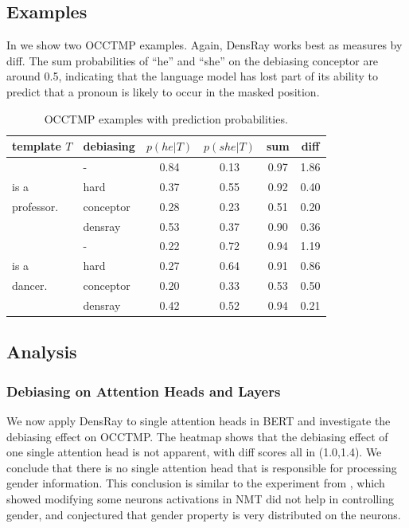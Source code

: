 \subsection{Examples}
In  we show two OCCTMP examples.
Again, DensRay works best as measures by diff.
The sum probabilities of ``he'' and ``she''
on the debiasing conceptor are around 0.5, indicating that
the language model has lost part of its ability to predict that 
a pronoun is  likely to occur in the masked position.
\begin{table}[h]
	\centering
	\footnotesize
		\vspace{0cm}  
	\setlength{\abovecaptionskip}{0.1cm}   
	\setlength{\belowcaptionskip}{0cm}  
	\begin{tabular}{llcccc}
		\toprule
		template $T$ & debiasing & $p(he|T)$ & $p(she|T)$ &sum&diff\\
		\midrule
		 & - & 0.84 & 0.13&0.97&1.86\\
		\text{[MASK]} is a& hard& 0.37 & 0.55&0.92&0.40\\
	    professor.	& conceptor& 0.28 & 0.23&0.51&{0.20}\\
		& densray & 0.53 & 0.37&0.90&0.36\\
		\midrule
		 & - & 0.22 & 0.72&0.94&1.19\\
		\text{[MASK]} is a& hard& 0.27 & 0.64&0.91&0.86\\
		dancer.  & conceptor& 0.20 & 0.33&0.53&0.50\\
		& densray& 0.42 & 0.52&0.94&0.21\\
		\bottomrule
	\end{tabular}
	\caption{
		OCCTMP examples with prediction probabilities.}
\end{table}

\subsection{Analysis}

\subsubsection*{Debiasing on Attention Heads and Layers}
We now apply DensRay to single attention heads in BERT and investigate the debiasing effect on OCCTMP. The heatmap  shows that the debiasing effect of one single attention head is not apparent, with diff scores all in (1.0,1.4). We conclude that there is no single attention head that is responsible for processing gender information.
This conclusion is similar to the experiment from , which showed modifying some neurons activations in NMT did not help in controlling gender, and conjectured that gender property is very distributed on the neurons.

